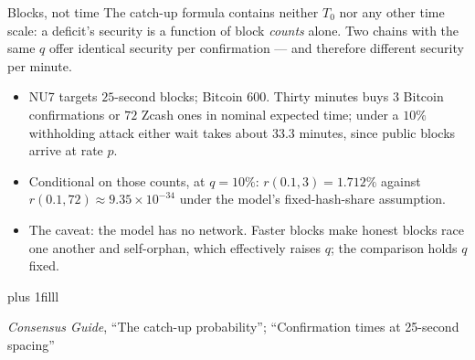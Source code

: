 \documentclass[aspectratio=169,11pt]{beamer}
\newcommand{\src}[1]{\par\vskip0pt plus 1filll
  {\fontsize{6}{7.2}\selectfont\color{arbdim}\raggedright #1\par}}
\begin{document}
\begin{frame}{Blocks, not time}
The catch-up formula contains neither $T_0$ nor any other time scale:
a deficit's security is a function of block \emph{counts} alone. Two
chains with the same $q$ offer identical security per confirmation ---
and therefore different security per minute.
\medskip
\begin{itemize}
\item NU7 targets $25$-second blocks; \alert{Bitcoin} $600$. Thirty
  minutes buys $3$ Bitcoin confirmations or $72$ Zcash ones in nominal
  expected time; under a $10\%$ withholding attack either wait takes
  about $33.3$ minutes, since public blocks arrive at rate $p$.
\item Conditional on those counts, at $q = 10\%$:
  $r(0.1, 3) = 1.712\%$ against $r(0.1, 72) \approx 9.35 \times
  10^{-34}$ under the model's fixed-hash-share assumption.
\item The caveat: the model has no network. Faster blocks make honest
  blocks race one another and self-orphan, which effectively raises
  $q$; the comparison holds $q$ fixed.
\end{itemize}
\src{\emph{Consensus Guide}, ``The catch-up probability''; ``Confirmation times at 25-second spacing''}
\end{frame}
\end{document}
